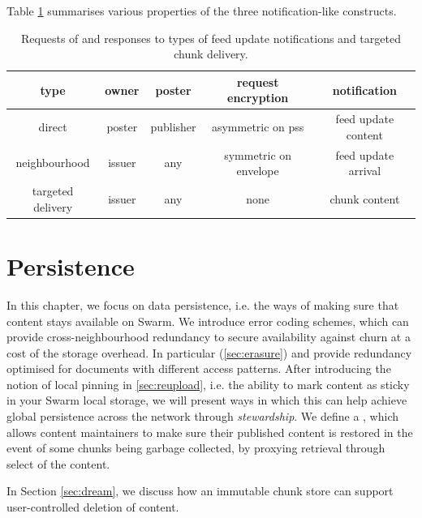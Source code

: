 Table \ref{tab:notifications} summarises various properties of the three notification-like constructs.

\begin{table}[htpb]
    \centering
    \begin{tabular}{c|c|c|c|c|}
    type & owner & poster & request encryption & notification  \\\hline
         direct & poster & publisher & asymmetric on pss & feed update  content\\
         neighbourhood & issuer & any & symmetric on envelope & feed update arrival\\
         targeted delivery & issuer & any & none & chunk content\\
    \end{tabular}
    \caption[Feed update notifications]{Requests of and responses to types of feed update notifications and targeted chunk delivery.}
    \label{tab:notifications}
\end{table}

\chapter{Persistence \statusgreen}\label{sec:persistence}


In this chapter, we focus on data persistence, i.e. the ways of making sure that content stays available on Swarm. 
We introduce error coding schemes, which can provide cross-neighbourhood redundancy to secure availability against churn at a cost of the storage overhead. 
In particular  (\ref{sec:erasure}) and   %
provide redundancy optimised for documents with different access patterns.
After introducing the notion of local pinning in \ref{sec:reupload}, i.e. the ability to mark content as sticky in your Swarm local storage, we will present ways in which this can help achieve global persistence across the network through \emph{stewardship}. We define a , which allows content maintainers to make sure their published content is restored in the event of some chunks being garbage collected, by proxying retrieval through select  of the content.

In Section \ref{sec:dream}, we discuss how an immutable chunk store can support user-controlled deletion of content.


